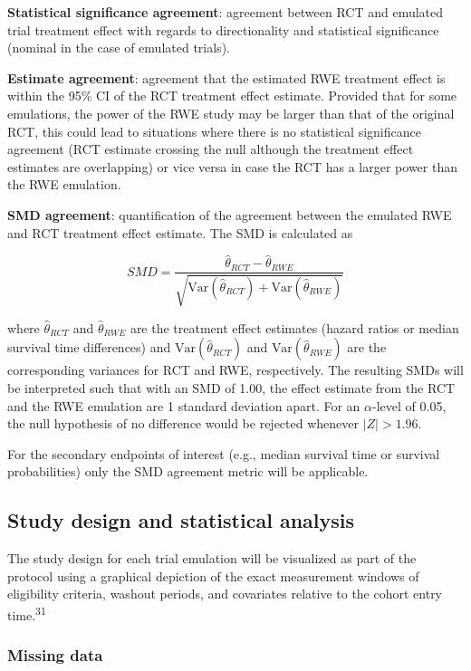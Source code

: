 \documentclass[
  letterpaper,
  DIV=11,
  numbers=noendperiod]{scrartcl}
\begin{document}
\textbf{Statistical significance agreement}: agreement between RCT and
emulated trial treatment effect with regards to directionality and
statistical significance (nominal in the case of emulated trials).

\textbf{Estimate agreement}: agreement that the estimated RWE treatment
effect is within the 95\% CI of the RCT treatment effect estimate.
Provided that for some emulations, the power of the RWE study may be
larger than that of the original RCT, this could lead to situations
where there is no statistical significance agreement (RCT estimate
crossing the null although the treatment effect estimates are
overlapping) or vice versa in case the RCT has a larger power than the
RWE emulation.

\textbf{SMD agreement}: quantification of the agreement between the
emulated RWE and RCT treatment effect estimate. The SMD is calculated as

\[
SMD = \frac{\hat{\theta}_{RCT} - \hat{\theta}_{RWE}}{\sqrt{\text{Var}(\hat{\theta}_{RCT}) + \text{Var}(\hat{\theta}_{RWE})}}
\]

where \(\hat{\theta}_{RCT}\) and \(\hat{\theta}_{RWE}\) are the
treatment effect estimates (hazard ratios or median survival time
differences) and \(\text{Var}(\hat{\theta}_{RCT})\) and
\(\text{Var}(\hat{\theta}_{RWE})\) are the corresponding variances for
RCT and RWE, respectively. The resulting SMDs will be interpreted such
that with an SMD of 1.00, the effect estimate from the RCT and the RWE
emulation are 1 standard deviation apart. For an \(\alpha\)-level of
0.05, the null hypothesis of no difference would be rejected whenever
\(|Z| > 1.96\).

For the secondary endpoints of interest (e.g., median survival time or
survival probabilities) only the SMD agreement metric will be
applicable.

\subsection{Study design and statistical
analysis}\label{study-design-and-statistical-analysis}

The study design for each trial emulation will be visualized as part of
the protocol using a graphical depiction of the exact measurement
windows of eligibility criteria, washout periods, and covariates
relative to the cohort entry time.\textsuperscript{31}

\subsubsection{Missing data}\label{missing-data}
\end{document}

